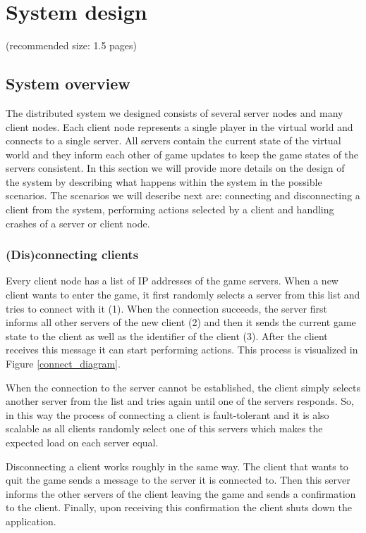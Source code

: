 \section{System design}
(recommended size: 1.5 pages)

\subsection{System overview}
The distributed system we designed consists of several server nodes and many client nodes. Each client node represents a single player in the virtual world and connects to a single server. All servers contain the current state of the virtual world and they inform each other of game updates to keep the game states of the servers consistent. In this section we will provide more details on the design of the system by describing what happens within the system in the possible scenarios. The scenarios we will describe next are: connecting and disconnecting a client from the system, performing actions selected by a client and handling crashes of a server or client node.

\subsubsection*{(Dis)connecting clients}
Every client node has a list of IP addresses of the game servers. When a new client wants to enter the game, it first randomly selects a server from this list and tries to connect with it (1). When the connection succeeds, the server first informs all other servers of the new client (2) and then it sends the current game state to the client as well as the identifier of the client (3). After the client receives this message it can start performing actions. This process is visualized in Figure \ref{connect_diagram}.

When the connection to the server cannot be established, the client simply selects another server from the list and tries again until one of the servers responds. So, in this way the process of connecting a client is fault-tolerant and it is also scalable as all clients randomly select one of this servers which makes the expected load on each server equal.

Disconnecting a client works roughly in the same way. The client that wants to quit the game sends a message to the server it is connected to. Then this server informs the other servers of the client leaving the game and sends a confirmation to the client. Finally, upon receiving this confirmation the client shuts down the application.

